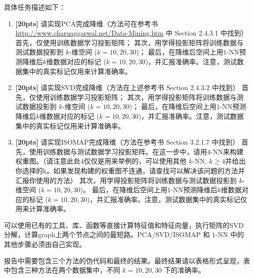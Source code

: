 \documentclass[a4paper,UTF8]{article}
\numberwithin{equation}{section}
\begin{document}
具体任务描述如下：
\begin{enumerate}
	\item \textbf{[20pts]} 请实现PCA完成降维（方法可在参考书\url{http://www.charuaggarwal.net/Data-Mining.htm} 中 Section 2.4.3.1 中找到）
	\subitem 首先，仅使用训练数据学习投影矩阵；
	\subitem 其次，用学得投影矩阵将训练数据与测试数据投影到 $k$-维空间 ($k=10,20,30$)；
	\subitem 最后，在降维后空间上用$1$-NN预测降维后$k$维数据对应的标记 ($k=10,20,30$)，并汇报准确率。注意，测试数据集中的真实标记仅用来计算准确率。
	\item \textbf{[20pts]} 请实现SVD完成降维（方法在上述参考书 Section 2.4.3.2 中找到）
	\subitem 首先，仅使用训练数据学习投影矩阵；
	\subitem 其次，用学得投影矩阵将训练数据与测试数据投影到 $k$-维空间 ($k=10,20,30$)；
	\subitem 最后，在降维后空间上用$1$-NN预测降维后$k$维数据对应的标记 ($k=10,20,30$)，并汇报准确率。注意，测试数据集中的真实标记仅用来计算准确率。
	\item \textbf{[20pts]} 请实现ISOMAP完成降维（方法在参考书 Section 3.2.1.7 中找到）
	\subitem 首先，使用训练数据与测试数据学习投影矩阵。在这一步中，请用$4$-NN来构建权重图。（请注意此处$4$仅仅是用来举例的，可以使用其他 $k$-NN, $k\geq 4$并给出你选择的k。如果发现构建的权重图不连通，请查找可以解决该问题的方法并汇报你使用的方法）
	\subitem 其次，用学得投影矩阵将训练数据与测试数据投影到 $k$-维空间 ($k=10,20,30$)。
	\subitem 最后，在降维后空间上用$1$-NN预测降维后$k$维数据对应的标记 ($k=10,20,30$)，并汇报准确率。注意，测试数据集中的真实标记仅用来计算准确率。
\end{enumerate}

可以使用已有的工具、库、函数等直接计算特征值和特征向量，执行矩阵的SVD分解，计算graph上两个节点之间的最短路。PCA/SVD/ISOMAP 和 $1$-NN 中的其他步骤必须由自己实现。

报告中需要包含三个方法的伪代码和最终的结果。最终结果请以表格形式呈现，表中包含三种方法在两个数据集中，不同 $k=10,20,30$ 下的准确率。
\end{document}
